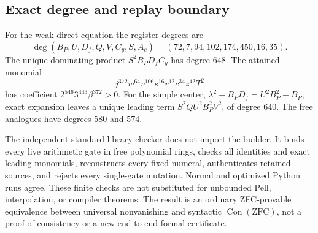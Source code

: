 \subsection{Exact degree and replay boundary}
For the weak direct equation the register degrees are
\[
 \deg(B_P,U,D_f,Q,V,C_y,S,A_c)=(72,7,94,102,174,450,16,35).
\]
The unique dominating product \(S^2B_PD_fC_y\) has degree \(648\).
The attained monomial
\[
 j^{372}w^{64}v^{106}s^{16}r^{12}c^{34}z^{42}T^2
\]
has coefficient \(2^{546}3^{443}\beta^{372}>0\).
For the simple center,
\(\lambda^2-B_PD_f=U^2B_P^2-B_P\); exact expansion leaves a unique
leading term \(S^2QU^2B_P^2V^2\), of degree \(640\).
The free analogues have degrees \(580\) and \(574\).

The independent standard-library checker does not import the builder.
It binds every live arithmetic gate in free polynomial rings, checks
all identities and exact leading monomials, reconstructs every fixed
numeral, authenticates retained sources, and rejects every single-gate
mutation. Normal and optimized Python runs agree. These finite checks
are not substituted for unbounded Pell, interpolation, or compiler
theorems. The result is an ordinary ZFC-provable equivalence between
universal nonvanishing and syntactic \(\operatorname{Con}(\mathrm{ZFC})\),
not a proof of consistency or a new end-to-end formal certificate.
